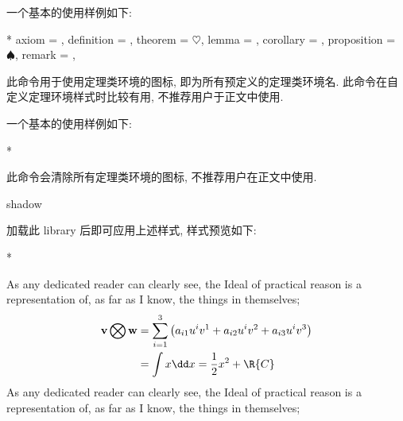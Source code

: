 一个基本的使用样例如下\zchcmd:
\begin{DocExample}*
\zthmiconset        
  {
    axiom       = ,
    definition  = , 
    theorem     = \(\heartsuit\), 
    lemma       = ,
    corollary   = , 
    proposition = \(\spadesuit\), 
    remark      = ,
  }
\end{DocExample}


\begin{function}[updated=2025-04-25]{\zthmiconuse}
  \begin{syntax}
  \end{syntax}
  此命令用于使用定理类环境的图标,  即为所有预定义的定理类环境名. 
  此命令在自定义定理环境样式时比较有用, 不推荐用户于正文中使用. \par
  一个基本的使用样例如下\zchcmd:
\end{function}
\begin{DocExample}*
\end{DocExample}


\begin{function}[updated=2025-04-25]{\zthmiconrm}
  \begin{syntax}
  \end{syntax}
  此命令会清除所有定理类环境的图标, 不推荐用户在正文中使用.
\end{function}



\begin{function}[updated=2024-12-05]{shadow}
  \begin{syntax}
  \end{syntax}
  加载此 library 后即可应用上述样式, 样式预览如下: 
\end{function}
\begingroup
{}
\begin{DocExample}*
\begin{remark}
As any dedicated reader can clearly see, the Ideal of practical
reason is a representation of, as far as I know, the things in themselves; 
\begin{align}
\underset{}{\mathbf{v} \bigotimes \mathbf{w}} 
    & = \sum_{i=1}^3\left(a_{i1}u^iv^1+a_{i2}u^iv^2+a_{i3}u^iv^3\right) \\
    & = \int x \dd x = \frac12 x^2 + \R{C} 
  \end{align}  
As any dedicated reader can clearly see, the Ideal of practical
reason is a representation of, as far as I know, the things in themselves;%
\end{remark}
\end{DocExample}
\endgroup


